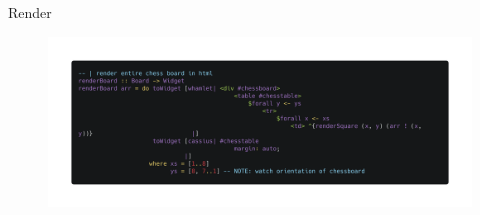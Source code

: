 \documentclass{beamer}
\begin{document}
\begin{frame}{Render}
\begin{figure}
\includegraphics[width=\linewidth]{renderboard}
\end{figure}
\end{frame}
\end{document}
